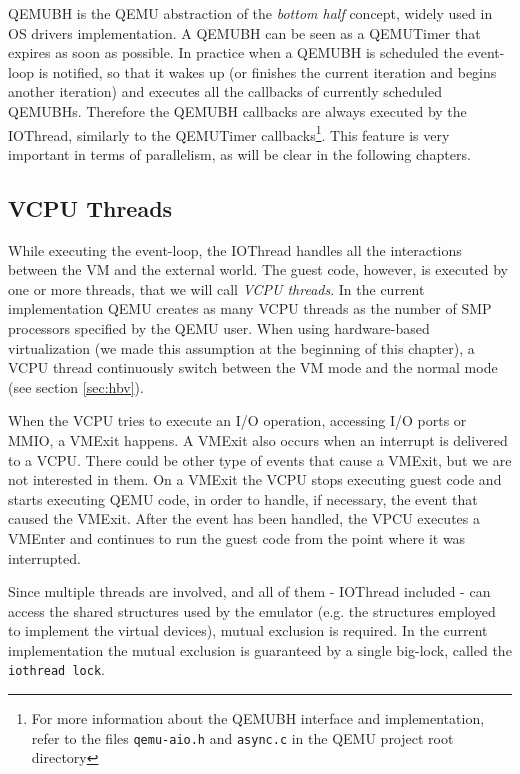 \vspace{0.5cm}

QEMUBH is the QEMU abstraction of the \emph{bottom half} concept, widely used in OS drivers implementation. A QEMUBH can be seen as
a QEMUTimer that expires as soon as possible. In practice when a QEMUBH is scheduled the event-loop is notified, so that it
wakes up (or finishes the current iteration and begins another iteration) and executes all the callbacks of currently scheduled QEMUBHs.
Therefore the QEMUBH callbacks are always executed by the IOThread, similarly to the QEMUTimer callbacks\footnote{For more information
about the QEMUBH interface and implementation, refer to the files \texttt{qemu-aio.h} and \texttt{async.c} in the QEMU project
root directory}. This feature is very important in terms of parallelism, as will be clear in the following chapters.

\subsection{VCPU Threads}
While executing the event-loop, the IOThread handles all the interactions between the VM and the external world.
The guest code, however, is executed by one or more threads, that we will call \emph{VCPU threads}. In the current implementation QEMU
creates as many VCPU threads as the number of SMP processors specified by the QEMU user.
When using hardware-based virtualization (we made this assumption at the beginning of this chapter), a VCPU thread continuously
switch between the VM mode and the normal mode (see section \ref{sec:hbv}).

\vspace{0.5cm}

When the VCPU tries to execute an I/O operation, accessing I/O ports or MMIO, a VMExit happens. A VMExit also occurs when an interrupt
is delivered to a VCPU. There could be other type of events that cause a VMExit, but we are not interested in them.
On a VMExit the VCPU stops executing guest
code and starts executing QEMU code, in order to handle, if necessary, the event that caused the VMExit.
After the event has been handled, the VPCU executes a VMEnter and continues to run the guest code from the point where it was interrupted.

\vspace{0.5cm}

Since multiple threads are involved, and all of them - IOThread included - can access the shared structures used by the emulator
(e.g. the structures employed to implement the virtual devices), mutual exclusion is required. In the current implementation the
mutual exclusion is guaranteed by a single big-lock, called the \texttt{iothread lock}.


